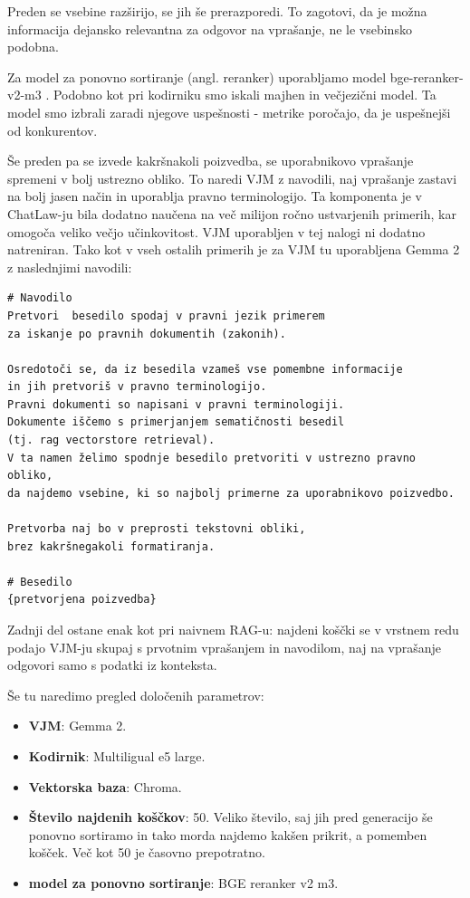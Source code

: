 \documentclass[a4paper,12pt,openright]{book}
\begin{document}
Preden se vsebine razširijo, se jih še prerazporedi. To zagotovi, da je možna informacija dejansko relevantna za odgovor na vprašanje, ne le vsebinsko podobna.

Za model za ponovno sortiranje (angl. reranker) uporabljamo model bge-reranker-v2-m3 \cite{bge-reranker-v2-m3_1} \cite{bge-reranker-v2-m3_2}. Podobno kot pri kodirniku smo iskali majhen in večjezični model. Ta model smo izbrali zaradi njegove uspešnosti - metrike poročajo, da je uspešnejši od konkurentov.

Še preden pa se izvede kakršnakoli poizvedba, se uporabnikovo vprašanje spremeni v bolj ustrezno obliko. To naredi VJM z navodili, naj vprašanje zastavi na bolj jasen način in uporablja pravno terminologijo. Ta komponenta je v ChatLaw-ju bila dodatno naučena na več milijon ročno ustvarjenih primerih, kar omogoča veliko večjo učinkovitost. VJM uporabljen v tej nalogi ni dodatno natreniran. Tako kot v vseh ostalih primerih je za VJM tu uporabljena Gemma 2 z naslednjimi navodili:

\begin{verbatim}
# Navodilo
Pretvori  besedilo spodaj v pravni jezik primerem 
za iskanje po pravnih dokumentih (zakonih).

Osredotoči se, da iz besedila vzameš vse pomembne informacije
in jih pretvoriš v pravno terminologijo.
Pravni dokumenti so napisani v pravni terminologiji.
Dokumente iščemo s primerjanjem sematičnosti besedil
(tj. rag vectorstore retrieval).
V ta namen želimo spodnje besedilo pretvoriti v ustrezno pravno obliko,
da najdemo vsebine, ki so najbolj primerne za uporabnikovo poizvedbo. 

Pretvorba naj bo v preprosti tekstovni obliki,
brez kakršnegakoli formatiranja.

# Besedilo
{pretvorjena poizvedba}
\end{verbatim}

Zadnji del ostane enak kot pri naivnem RAG-u: najdeni koščki se v vrstnem redu podajo VJM-ju skupaj s prvotnim vprašanjem in navodilom, naj na vprašanje odgovori samo s podatki iz konteksta.

Še tu naredimo pregled določenih parametrov:

\begin{itemize}
    \item \textbf{VJM}: Gemma 2.
    \item \textbf{Kodirnik}: Multiligual e5 large.
    \item \textbf{Vektorska baza}: Chroma.
    \item \textbf{Število najdenih koščkov}: 50. Veliko število, saj jih pred generacijo še ponovno sortiramo in tako morda najdemo kakšen prikrit, a pomemben košček. Več kot 50 je časovno prepotratno.
    \item \textbf{model za ponovno sortiranje}: BGE reranker v2 m3.
\end{itemize}
\end{document}
